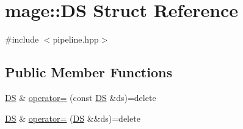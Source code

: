 \hypertarget{structmage_1_1_d_s}{}\section{mage\+:\+:DS Struct Reference}
\label{structmage_1_1_d_s}


{\ttfamily \#include $<$pipeline.\+hpp$>$}

\subsection*{Public Member Functions}
\begin{DoxyCompactItemize}
\item 
\hyperlink{structmage_1_1_d_s}{DS} \& \hyperlink{structmage_1_1_d_s_a57c7baf507273f52db793c00352798a3}{operator=} (const \hyperlink{structmage_1_1_d_s}{DS} \&ds)=delete
\item 
\hyperlink{structmage_1_1_d_s}{DS} \& \hyperlink{structmage_1_1_d_s_ac32f971e1e9c01664bd8d7dfb4404ed4}{operator=} (\hyperlink{structmage_1_1_d_s}{DS} \&\&ds)=delete
\end{DoxyCompactItemize}
